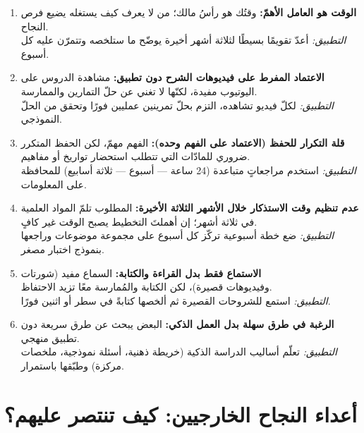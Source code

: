 \documentclass[12pt,a4paper]{book}
\begin{document}
	\begin{enumerate}
		\item \textbf{الوقت هو العامل الأهمّ:} وقتُك هو رأسُ مالك؛ من لا يعرف كيف يستغله يضيع فرص النجاح. \\
		\textit{التطبيق:} أعدّ تقويمًا بسيطًا لثلاثة أشهر أخيرة يوضّح ما ستلخصه وتتمرّن عليه كل أسبوع.
		
		\item \textbf{الاعتماد المفرط على فيديوهات الشرح دون تطبيق:} مشاهدة الدروس على اليوتيوب مفيدة، لكنّها لا تغني عن حلّ التمارين والممارسة. \\
		\textit{التطبيق:} لكلّ فيديو تشاهده، التزم بحلّ تمرينين عمليين فورًا وتحقق من الحلّ النموذجي.
		
		\item \textbf{قلة التكرار للحفظ (الاعتماد على الفهم وحده):} الفهم مهمّ، لكن الحفظ المتكرر ضروري للمادّات التي تتطلب استحضار تواريخ أو مفاهيم. \\
		\textit{التطبيق:} استخدم مراجعاتٍ متباعدة (24 ساعة — أسبوع — ثلاثة أسابيع) للمحافظة على المعلومات.
		
		\item \textbf{عدم تنظيم وقت الاستذكار خلال الأشهر الثلاثة الأخيرة:} المطلوب تلمّ المواد العلمية في ثلاثة أشهر؛ إن أهملتَ التخطيط يصبح الوقت غير كافٍ. \\
		\textit{التطبيق:} ضع خطة أسبوعية تركّز كل أسبوع على مجموعة موضوعات وراجعها بنموذج اختبار مصغر.
		
		\item \textbf{الاستماع فقط بدل القراءة والكتابة:} السماع مفيد (شورتات \\ وفيديوهات قصيرة)، لكن الكتابة والمُمارسة معًا تزيد الاحتفاظ. \\
		\textit{التطبيق:} استمع للشروحات القصيرة ثم ألخصها كتابةً في سطر أو اثنين فورًا.
		
		\item \textbf{الرغبة في طرق سهلة بدل العمل الذكي:} البعض يبحث عن طرق سريعة دون تطبيق منهجي. \\
		\textit{التطبيق:} تعلّم أساليب الدراسة الذكية (خريطة ذهنية، أسئلة نموذجية، ملخصات مركزة) وطبّقها باستمرار.
		
	\end{enumerate}
	
	
	
	\chapter{أعداء النجاح الخارجيين: كيف تنتصر عليهم؟}
	\label{sec:owner-experiences5}
	\label{chap:enemies}
	
\end{document}
